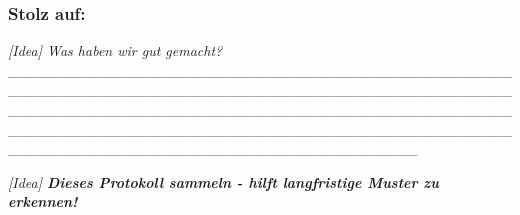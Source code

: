 \hypertarget{stolz-auf}{%
\subsubsection{\texorpdfstring{\textbf{Stolz auf:}}{Stolz auf:}}\label{stolz-auf}}

\emph{[Idea] Was haben wir gut gemacht?} \_\_\_\_\_\_\_\_\_\_\_\_\_\_\_\_\_\_\_\_\_\_\_\_\_\_\_\_\_\_\_\_\_\_\_\_\_\_\_\_\_\_\_\_\_\_\_\_\_\_\_\_\_\_\_\_\_\_\_\_\_\_\_\_\_\_\_\_\_\_\_\_\_\_\_\_\_\_\_\_\_\_\_\_\_\_\_\_\_\_\_\_\_\_\_\_\_\_\_\_\_\_\_\_\_\_\_\_\_\_\_\_\_\_\_\_\_\_\_\_\_\_\_\_\_\_\_\_\_\_\_\_\_\_\_\_\_\_\_\_\_\_\_\_\_\_\_\_\_\_\_\_\_\_\_\_\_\_\_\_\_\_\_\_\_\_\_\_\_\_\_\_\_\_\_\_\_\_\_\_\_\_\_\_\_\_\_\_\_\_\_\_\_\_\_\_\_\_\_\_\_\_\_\_\_\_\_\_\_\_\_\_\_\_\_\_\_\_\_\_\_\_\_\_\_\_\_\_\_\_\_

\emph{[Idea] \textbf{Dieses Protokoll sammeln - hilft langfristige Muster zu erkennen!}}
